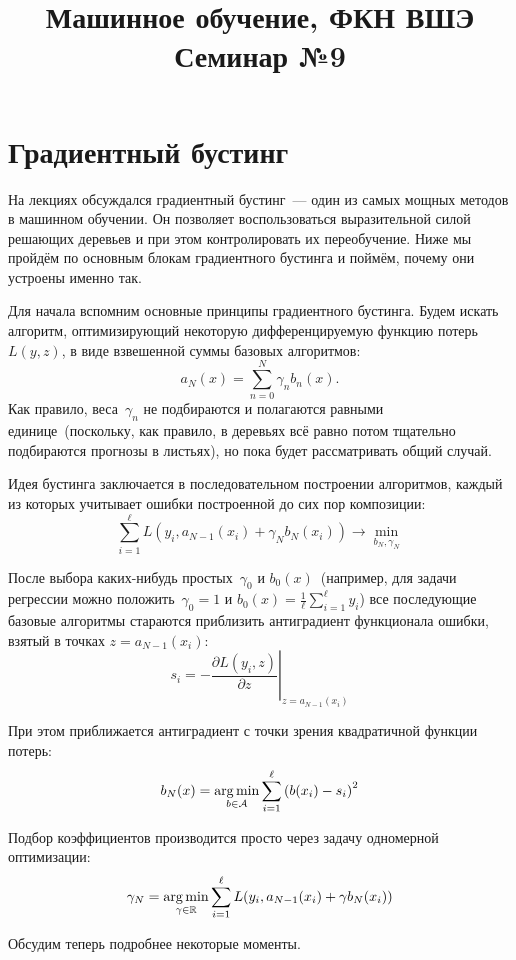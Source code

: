 \documentclass[12pt,fleqn]{article}
\title{Машинное обучение, ФКН ВШЭ\\Семинар №9}
\date{}
\author{}
\begin{document}
\maketitle


\section{Градиентный бустинг}

На лекциях обсуждался градиентный бустинг~--- один из самых мощных
методов в машинном обучении.
Он позволяет воспользоваться выразительной силой решающих деревьев и при этом
контролировать их переобучение.
Ниже мы пройдём по основным блокам градиентного бустинга
и поймём, почему они устроены именно так.

Для начала вспомним основные принципы градиентного бустинга.
Будем искать алгоритм, оптимизирующий некоторую дифференцируемую функцию потерь $L(y, z)$, в виде взвешенной суммы базовых алгоритмов:
\[
    a_N(x)
    =
    \sum_{n = 0}^{N}
        \gamma_n b_n(x).
\]
Как правило, веса~$\gamma_n$ не подбираются и полагаются равными единице~(поскольку, как правило, в деревьях всё равно потом тщательно подбираются прогнозы в листьях),
но пока будет рассматривать общий случай.

Идея бустинга заключается в последовательном построении алгоритмов, каждый из которых учитывает ошибки построенной до сих пор композиции:
\[
    \sum_{i = 1}^{\ell}
        L(y_i, a_{N - 1}(x_i) + \gamma_N b_N(x_i))
    \to
    \min_{b_N, \gamma_N}
\]

После выбора каких-нибудь простых~$\gamma_0$ и $b_0(x)$~(например, для задачи регрессии
можно положить~$\gamma_0 = 1$ и $b_0(x) = \frac 1\ell \sum_{i=1}^\ell y_i$)
все последующие базовые алгоритмы стараются приблизить антиградиент функционала ошибки, взятый в точках $z = a_{N - 1}(x_i)$:
\[
    s_i
    =
    -
    \left.
    \frac{\partial L(y_i, z)}{\partial z}
    \right|_{z = a_{N - 1}(x_i)}
\]

При этом приближается антиградиент с точки зрения квадратичной функции потерь:
\[
    b_N(x)
    =
    \mathop{\rm arg\,min}\limits_{b \in \mathcal{A}}
        \sum_{i = 1}^{\ell}
            \left(
                b(x_i) - s_i
            \right)^2
\]

Подбор коэффициентов производится просто через задачу одномерной оптимизации:
\[
    \gamma_N
    =
    \mathop{\rm arg\,min}\limits_{\gamma \in \mathbb{R}}
    \sum_{i=1}^{\ell}
    L(y_i, a_{N-1}(x_i) + \gamma b_N (x_i))
\]

Обсудим теперь подробнее некоторые моменты.
\end{document}
